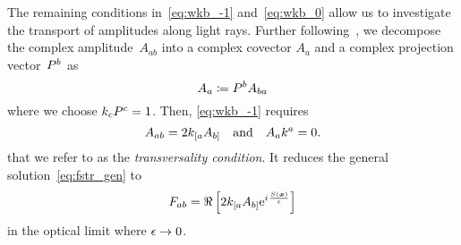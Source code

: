 The remaining conditions in~\eqref{eq:wkb_-1} and~\eqref{eq:wkb_0} allow us to investigate the transport of amplitudes along light rays. Further following~\autocite{SchneiderGravlens,EtheringtonNBiref,EtheringtonBiref}, we decompose the complex amplitude~$A_{ab}$ into a complex covector $A_a$ and a complex projection vector~$P^b$ as 
\begin{equation}
	A_a\coloneqq P^b A_{ba}	
\end{equation}
where we choose $k_cP^c=1$. Then, \eqref{eq:wkb_-1} requires
\begin{equation}\label{eq:trans_cond}
	A_{ab}=2k_{[ a}A_{b]} \quad \text{and} \quad A_ak^a=0
	\mathpunct{.}
\end{equation}
that we refer to as the \emph{transversality condition}. It reduces the general solution~\eqref{eq:fstr_gen} to
\begin{equation}\label{eq:fstr_optlim}
	F_{ab}=\Re\left[2k_{[ a}A_{b]}\mathrm{e}^{{i\mkern1mu}\frac{S(\boldsymbol{x})}{\epsilon}}\right]
\end{equation}
in the optical limit where $\epsilon\to0$.

